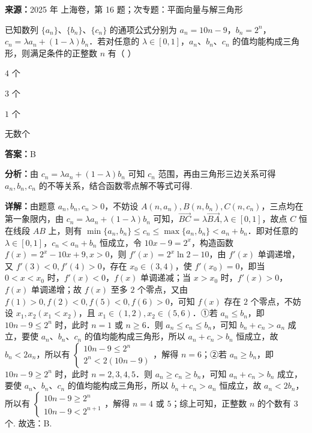 \begin{question}[points=5]
\textbf{来源：}2025 年 上海卷，第 16 题；次专题：平面向量与解三角形\par
已知数列 $\{a_n\}$、$\{b_n\}$、$\{c_n\}$ 的通项公式分别为 $a_n = 10n - 9$，$b_n = 2^n$，$c_n = \lambda a_n + (1-\lambda)b_n$．若对任意的 $\lambda \in [0,1]$，$a_n$、$b_n$、$c_n$ 的值均能构成三角形，则满足条件的正整数 $n$ 有（ ）
\begin{choices}
  \item $4$ 个
  \item $3$ 个
  \item $1$ 个
  \item 无数个
\end{choices}
\begin{solution}
\textbf{答案：}B

\textbf{分析：}由 $c_n = \lambda a_n + (1-\lambda)b_n$ 可知 $c_n$ 范围，再由三角形三边关系可得 $a_n, b_n, c_n$ 的不等关系，结合函数零点解不等式可得.

\textbf{详解：}由题意 $a_n, b_n, c_n > 0$，不妨设 $A(n, a_n), B(n, b_n), C(n, c_n)$，三点均在第一象限内，由 $c_n = \lambda a_n + (1-\lambda)b_n$ 可知，$\overrightarrow{BC} = \lambda \overrightarrow{BA}, \lambda \in [0,1]$，故点 $C$ 恒在线段 $AB$ 上，则有 $\min\{a_n, b_n\} \leq c_n \leq \max\{a_n, b_n\} < a_n + b_n$．即对任意的 $\lambda \in [0,1]$，$c_n < a_n + b_n$ 恒成立，令 $10x - 9 = 2^x$，构造函数 $f(x) = 2^x - 10x + 9, x > 0$，则 $f'(x) = 2^x \ln 2 - 10$，由 $f'(x)$ 单调递增，又 $f'(3) < 0, f'(4) > 0$，存在 $x_0 \in (3,4)$，使 $f'(x_0) = 0$，即当 $0 < x < x_0$ 时，$f'(x) < 0$，$f(x)$ 单调递减；当 $x > x_0$ 时，$f'(x) > 0$，$f(x)$ 单调递增；故 $f(x)$ 至多 $2$ 个零点，又由 $f(1) > 0, f(2) < 0, f(5) < 0, f(6) > 0$，可知 $f(x)$ 存在 $2$ 个零点，不妨设 $x_1, x_2 (x_1 < x_2)$，且 $x_1 \in (1,2), x_2 \in (5,6)$．①若 $a_n \leq b_n$，即 $10n - 9 \leq 2^n$ 时，此时 $n = 1$ 或 $n \geq 6$．则 $a_n \leq c_n \leq b_n$，可知 $b_n + c_n > a_n$ 成立，要使 $a_n$、$b_n$、$c_n$ 的值均能构成三角形，所以 $a_n + c_n > b_n$ 恒成立，故 $b_n < 2a_n$，所以有 $\begin{cases} 10n - 9 \leq 2^n \\ 2^n < 2(10n - 9) \end{cases}$，解得 $n = 6$；②若 $a_n \geq b_n$，即 $10n - 9 \geq 2^n$ 时，此时 $n = 2,3,4,5$．则 $a_n \geq c_n \geq b_n$，可知 $a_n + c_n > b_n$ 成立，要使 $a_n$、$b_n$、$c_n$ 的值均能构成三角形，所以 $b_n + c_n > a_n$ 恒成立，故 $a_n < 2b_n$，所以有 $\begin{cases} 10n - 9 \geq 2^n \\ 10n - 9 < 2^{n+1} \end{cases}$，解得 $n = 4$ 或 $5$；综上可知，正整数 $n$ 的个数有 $3$ 个. 故选：B.
\end{solution}
\end{question}

